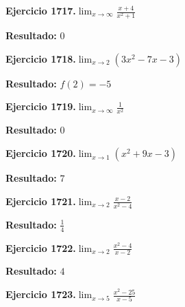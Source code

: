 \documentclass[10pt,a4paper]{article}
\begin{document}
\newpage
\begin{ejbox}
\textbf{Ejercicio 1717.}\quad $\lim_{x\to \infty} \frac{x + 4}{x^2 + 1}$
\end{ejbox}

\begin{solbox}
\textbf{Resultado:} \(\displaystyle 0\)
\end{solbox}

\begin{ejbox}
\textbf{Ejercicio 1718.}\quad $\lim_{x\to 2} (3x^2 -7x -3)$
\end{ejbox}

\begin{solbox}
\textbf{Resultado:} \(\displaystyle f(2) = -5\)
\end{solbox}

\begin{ejbox}
\textbf{Ejercicio 1719.}\quad $\lim_{x\to \infty} \frac{1}{x^2}$
\end{ejbox}

\begin{solbox}
\textbf{Resultado:} \(\displaystyle 0\)
\end{solbox}

\newpage
\begin{ejbox}
\textbf{Ejercicio 1720.}\quad $\lim_{x\to 1} (x^2 +9x -3)$
\end{ejbox}

\begin{solbox}
\textbf{Resultado:} \(\displaystyle 7\)
\end{solbox}

\begin{ejbox}
\textbf{Ejercicio 1721.}\quad $\lim_{x\to 2} \frac{x-2}{x^2-4}$
\end{ejbox}

\begin{solbox}
\textbf{Resultado:} \(\displaystyle \frac{1}{4}\)
\end{solbox}

\begin{ejbox}
\textbf{Ejercicio 1722.}\quad $\lim_{x\to 2} \frac{x^2-4}{x-2}$
\end{ejbox}

\begin{solbox}
\textbf{Resultado:} \(\displaystyle 4\)
\end{solbox}

\newpage
\begin{ejbox}
\textbf{Ejercicio 1723.}\quad $\lim_{x\to 5} \frac{x^2-25}{x-5}$
\end{ejbox}
\end{document}
